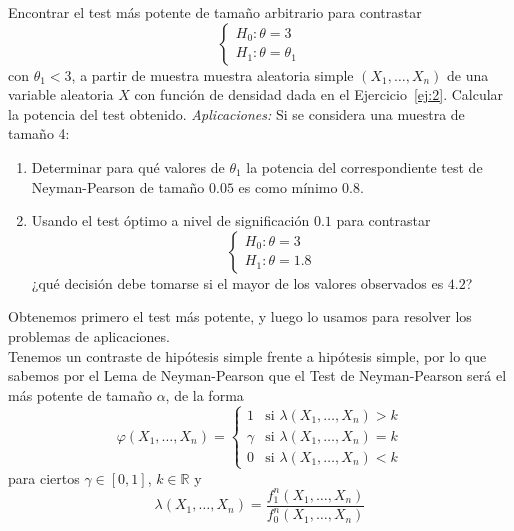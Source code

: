 \documentclass[12pt]{article}
\newcommand{\R}{\mathbb{R}}
\begin{document}
    \newpage

    \begin{ejercicio}
        Encontrar el test más potente de tamaño arbitrario para contrastar
        \begin{equation*}
            \left\{\begin{array}{l}
                H_0: \theta = 3 \\
                H_1 : \theta = \theta_1
            \end{array}\right.
        \end{equation*}
        con $\theta_1<3$, a partir de muestra muestra aleatoria simple $(X_1,\ldots,X_n)$ de una variable aleatoria $X$ con función de densidad dada en el Ejercicio~\ref{ej:2}. Calcular la potencia del test obtenido.\newline
        \textit{Aplicaciones:} Si se considera una muestra de tamaño 4:
        \begin{enumerate}[label=\alph*)]
            \item Determinar para qué valores de $\theta_1$ la potencia del correspondiente test de Neyman-Pearson de tamaño $0.05$ es como mínimo $0.8$.
            \item Usando el test óptimo a nivel de significación $0.1$ para contrastar
            \begin{equation*}
                \left\{\begin{array}{l}
                    H_0: \theta = 3 \\
                    H_1 : \theta = 1.8
                \end{array}\right.
            \end{equation*}
            ¿qué decisión debe tomarse si el mayor de los valores observados es $4.2$?
        \end{enumerate}

        Obtenemos primero el test más potente, y luego lo usamos para resolver los problemas de aplicaciones. \\

        Tenemos un contraste de hipótesis simple frente a hipótesis simple, por lo que sabemos por el Lema de Neyman-Pearson que el 
        Test de Neyman-Pearson será el más potente de tamaño $\alpha$, de la forma
        $$\varphi(X_1, \ldots, X_n) = \begin{cases}
            1 &\text{si } \lambda(X_1, \ldots, X_n) > k \\
            \gamma &\text{si } \lambda(X_1, \ldots, X_n) = k \\
            0 &\text{si } \lambda(X_1, \ldots, X_n) < k
        \end{cases}$$
        para ciertos $\gamma \in [0,1]$, $k \in \R$ y 
        $$\lambda(X_1, \ldots, X_n) = \dfrac{f_1^n(X_1, \ldots, X_n)}{f_0^n(X_1, \ldots, X_n)}$$


\end{ejercicio}
\end{document}
